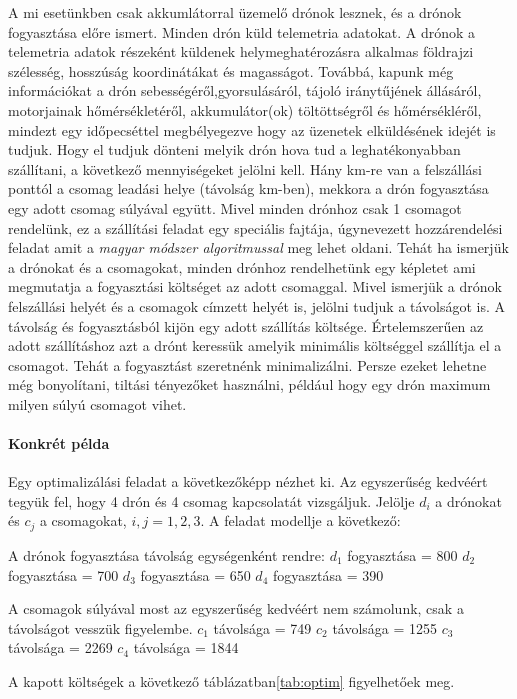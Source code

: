 A mi esetünkben csak akkumlátorral üzemelő drónok lesznek, és a drónok fogyasztása előre ismert.
Minden drón küld telemetria adatokat.
A drónok a telemetria adatok részeként küldenek helymeghatérozásra alkalmas földrajzi szélesség, hosszúság koordinátákat és magasságot.
Továbbá, kapunk még információkat a drón sebességéről,gyorsulásáról, tájoló iránytűjének állásáról, motorjainak hőmérsékletéről,
akkumulátor(ok) töltöttségről és hőmérsékléről, mindezt egy időpecséttel megbélyegezve hogy az üzenetek elküldésének idejét is tudjuk.
Hogy el tudjuk dönteni melyik drón hova tud a leghatékonyabban szállítani, a következő mennyiségeket jelölni kell. Hány km-re van a felszállási ponttól a csomag leadási helye (távolság km-ben), mekkora a drón fogyasztása egy adott csomag súlyával együtt.
Mivel minden drónhoz csak 1 csomagot rendelünk, ez a szállítási feladat egy speciális fajtája, úgynevezett hozzárendelési feladat amit a \textit{magyar módszer algoritmussal}\cite{magyar-modszer} meg lehet oldani.
Tehát ha ismerjük a drónokat és a csomagokat, minden drónhoz rendelhetünk egy képletet ami megmutatja a fogyasztási költséget az adott csomaggal. Mivel ismerjük a drónok felszállási helyét és a csomagok címzett helyét is, jelölni tudjuk a távolságot is.
A távolság és fogyasztásból kijön egy adott szállítás költsége. Értelemszerűen az adott szállításhoz azt a drónt keressük amelyik minimális költséggel szállítja el a csomagot. Tehát a fogyasztást szeretnénk minimalizálni.
Persze ezeket lehetne még bonyolítani, tiltási tényezőket használni, például hogy egy drón maximum milyen súlyú csomagot vihet.

\paragraph{Konkrét példa}
Egy optimalizálási feladat a következőképp nézhet ki. Az egyszerűség kedvéért tegyük fel, hogy 4 drón és 4 csomag kapcsolatát vizsgáljuk. Jelölje $d_{i}$ a drónokat és $c_{j}$ a csomagokat, $i, j = 1, 2, 3.$
A feladat modellje a következő:

A drónok fogyasztása távolság egységenként rendre:
$d_{1}$ fogyasztása = 800
$d_{2}$ fogyasztása = 700
$d_{3}$ fogyasztása = 650
$d_{4}$ fogyasztása = 390

A csomagok súlyával most az egyszerűség kedvéért nem számolunk, csak a távolságot vesszük figyelembe.
$c_{1}$ távolsága = 749
$c_{2}$ távolsága = 1255
$c_{3}$ távolsága = 2269
$c_{4}$ távolsága = 1844

A kapott költségek a következő táblázatban\ref{tab:optim} figyelhetőek meg.

